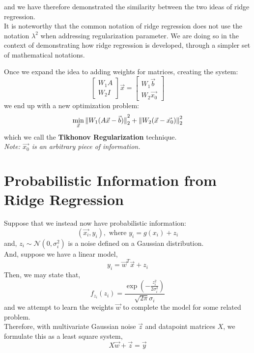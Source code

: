 and we have therefore demonstrated the similarity between the two ideas of ridge regression. \\
It is noteworthy that the common notation of ridge regression does not use the notation $\lambda^2$ when addressing regularization parameter.
We are doing so in the context of demonstrating how ridge regression is developed, through a simpler set of mathematical notations.
\par
Once we expand the idea to adding weights for matrices, creating the system:
\[
    \begin{bmatrix} W_1 A \\ W_2 I \end{bmatrix} \vec{x} = \begin{bmatrix} W_1 \vec{b} \\ W_2 \vec{x_0} \end{bmatrix}
\]
we end up with a new optimization problem:
\[
    \min_{\vec{x}} \pnorm[2]{W_1 (A \vec{x} - \vec{b})}{2} + \pnorm[2]{W_2 (\vec{x} - \vec{x_0})}{2}
\]
which we call the \textbf{Tikhonov Regularization} technique. \\
\textit{Note: $\vec{x_0}$ is an arbitrary piece of information.}

\section{Probabilistic Information from Ridge Regression}
Suppose that we instead now have probabilistic information:
\[
    (\vec{x_i}, y_i), \text{ where } y_i = g(x_i) + z_i
\]
and, $z_i \sim \mathcal{N}(0, \sigma_i^2)$ is a noise defined on a Gaussian distribution. \\
And, suppose we have a linear model,
\[
    y_i = \vec{w}^T \vec{x} + z_i
\]
Then, we may state that,
\[
    f_{z_i} (z_i) = \frac{\exp(-\frac{z_i^2}{2\sigma_i^2})}{\sqrt{2 \pi} \sigma_i}
\]
and we attempt to learn the weights $\vec{w}$ to complete the model for some related problem. \\
Therefore, with multivariate Gaussian noise $\vec{z}$ and datapoint matrices $X$, we formulate this as a least square system,
\[
    X \vec{w} + \vec{z} = \vec{y}
\]

